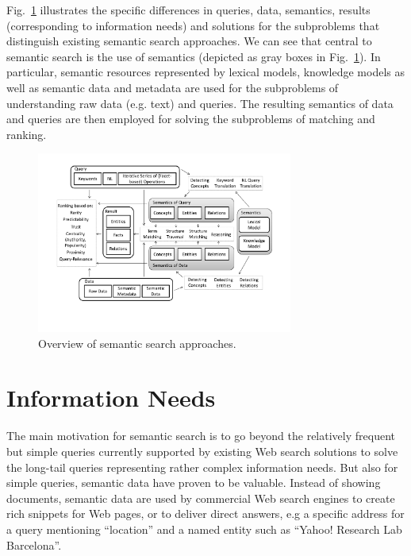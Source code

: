 %
Fig.~\ref{fig:semsearch_detailed} illustrates the specific differences in queries, data, semantics, results (corresponding to information needs) and solutions for the subproblems that distinguish existing semantic search approaches. We can see that central to semantic search is the use of semantics (depicted as gray boxes in Fig.~\ref{fig:semsearch_detailed}). In particular, semantic resources represented by lexical models, knowledge models as well as semantic data and metadata are used for the subproblems of understanding raw data (e.g. text) and queries. The resulting semantics of data and queries are then employed for solving the subproblems of matching and ranking.   
  

\begin{figure}[tbh]
	\centering
		\includegraphics[width=0.75\textwidth]{figs/semsearch_detailed}
	\caption{Overview of semantic search approaches.}
	\label{fig:semsearch_detailed}
	\vspace{-0.5cm}
\end{figure}

\section{Information Needs}\label{sec:needs}

The main motivation for semantic search is to go beyond the relatively frequent but simple queries currently supported by existing Web search solutions to solve the long-tail queries representing rather complex information needs. But also for simple queries, semantic data have proven to be valuable. Instead of showing documents, semantic data are used by commercial Web search engines to create rich snippets for Web pages, or to deliver direct answers, e.g a specific address for a query mentioning ``location'' and a named entity such as ``Yahoo! Research Lab Barcelona''. 

